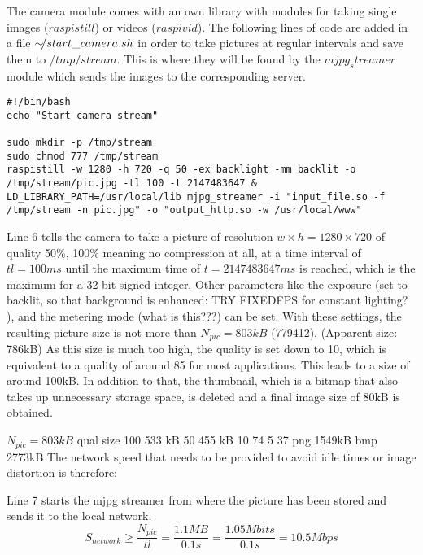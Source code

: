 The camera module comes with an own library with modules for taking single images ($raspistill$) or videos ($raspivid$).
The following lines of code are added in a file $\sim\hspace{-0.5em}/start\_camera.sh$ in order to take pictures at regular intervals and save them to $/tmp/stream$. This is where they will be found by the $mjpg_streamer$ module which sends the images to the corresponding server.

\begin{center}
\begin{minipage}{0.9\linewidth}
\begin{lstlisting}[caption=$\sim\hspace{-0.5em}/start\_camera.sh$, label=startcamera, frame=none]
#!/bin/bash
echo "Start camera stream"

sudo mkdir -p /tmp/stream
sudo chmod 777 /tmp/stream
raspistill -w 1280 -h 720 -q 50 -ex backlight -mm backlit -o /tmp/stream/pic.jpg -tl 100 -t 2147483647 &
LD_LIBRARY_PATH=/usr/local/lib mjpg_streamer -i "input_file.so -f /tmp/stream -n pic.jpg" -o "output_http.so -w /usr/local/www"
\end{lstlisting}
\end{minipage}
\end{center}

Line 6 tells the camera to take a picture of resolution $w \times h = 1280 \times 720$ of quality 50\%, 100\% meaning no compression at all, at a time interval of $tl = 100ms$ until the maximum time of $t = 2147483647ms$ is reached, which is the maximum for a 32-bit signed integer.
Other parameters like the exposure (set to backlit, so that background is enhanced: TRY FIXEDFPS for constant lighting? ), and the metering mode (what is this???) can be set. 
With these settings, the resulting picture size is not more than $N_{pic}=803kB$ (779412). (Apparent size: 786kB)
As this size is much too high, the quality is set down to 10, which is equivalent to a quality of around 85 for most applications. This leads to a size of around 100kB. In addition to that, the thumbnail, which is a bitmap that also takes up unnecessary storage space, is deleted and a final image size of 80kB is obtained.

 $N_{pic}=803kB$ 
qual	size
100	533 kB
50	455 kB
10	74
5	37
png  1549kB
bmp 2773kB
 The network speed that needs to be provided to avoid idle times or image distortion is therefore:

Line 7 starts the mjpg streamer from where the picture has been stored and sends it to the local network. 
\begin{equation}
	S_{network} \geq \frac{N_{pic}}{tl}  = \frac{1.1MB}{0.1s}= \frac{1.05Mbits}{0.1s} = 10.5 Mbps
\end{equation}

